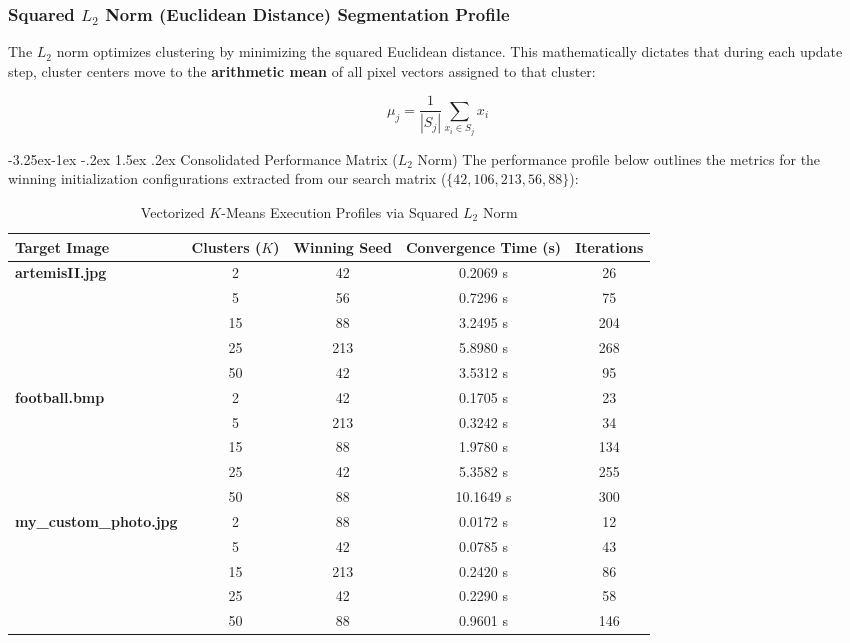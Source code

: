 \documentclass[twoside, 10pt]{article}
\makeatletter
\renewcommand{\paragraph}{\@startsection{paragraph}{4}{\z@}%
    {-3.25ex\@plus -1ex \@minus -.2ex}%
    {1.5ex \@plus .2ex}%
    {\normalfont\normalsize\bfseries}}
\makeatother
\begin{document}
\subsubsection{Squared $L_2$ Norm (Euclidean Distance) Segmentation Profile}

The $L_2$ norm optimizes clustering by minimizing the squared Euclidean distance. This mathematically dictates that during each update step, cluster centers move to the \textbf{arithmetic mean} of all pixel vectors assigned to that cluster:

\begin{equation}
\mu_j = \frac{1}{|S_j|} \sum_{x_i \in S_j} x_i
\end{equation}

\paragraph{Consolidated Performance Matrix ($L_2$ Norm)}
The performance profile below outlines the metrics for the winning initialization configurations extracted from our search matrix ($\{42, 106, 213, 56, 88\}$):

\begin{table}[H]
\centering
\caption{Vectorized $K$-Means Execution Profiles via Squared $L_2$ Norm}%
\label{tab:l2_metrics}
\begin{tabular}{lcccc}
\toprule
\textbf{Target Image} & \textbf{Clusters ($K$)} & \textbf{Winning Seed} & \textbf{Convergence Time (s)} & \textbf{Iterations} \\
\midrule
\textbf{artemisII.jpg} & 2  & 42  & 0.2069 s & 26  \\
                       & 5  & 56  & 0.7296 s & 75  \\
                       & 15 & 88  & 3.2495 s & 204 \\
                       & 25 & 213 & 5.8980 s & 268 \\
                       & 50 & 42  & 3.5312 s & 95  \\
\midrule
\textbf{football.bmp}  & 2  & 42  & 0.1705 s & 23  \\
                       & 5  & 213 & 0.3242 s & 34  \\
                       & 15 & 88  & 1.9780 s & 134 \\
                       & 25 & 42  & 5.3582 s & 255 \\
                       & 50 & 88  & 10.1649 s& 300 \\
\midrule
\textbf{my\_custom\_photo.jpg} & 2  & 88  & 0.0172 s & 12  \\
                               & 5  & 42  & 0.0785 s & 43  \\
                               & 15 & 213 & 0.2420 s & 86  \\
                               & 25 & 42  & 0.2290 s & 58  \\
                               & 50 & 88  & 0.9601 s & 146 \\
\bottomrule
\end{tabular}
\end{table}
\end{document}
